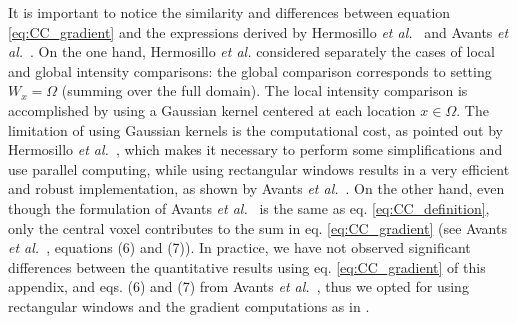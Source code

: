 It is important to notice the similarity and differences between equation \eqref{eq:CC_gradient} and the expressions derived by Hermosillo {\it et al.}~\cite{Hermosillo2004}
and Avants {\it et al.}~\cite{Avants2008}. On the one hand, Hermosillo {\it et al.} considered separately the cases of local and global intensity comparisons: the global comparison corresponds to setting $W_{x} = \Omega$ (summing over the full domain). The local intensity comparison is accomplished by using a Gaussian kernel centered at each location $x\in\Omega$. The limitation of using Gaussian kernels is the computational cost, as pointed out by Hermosillo {\it et al.}~\cite{Hermosillo2004},
which makes it necessary to perform some simplifications and use parallel computing, while using rectangular windows results in a very efficient and robust implementation, as shown by Avants {\it et al.}~\cite{Avants2008}. On the other hand, even though the formulation of Avants {\it et al.}~\cite{Avants2008}
is the same as eq. \eqref{eq:CC_definition}, only the central voxel contributes to the sum in eq. \eqref{eq:CC_gradient} (see Avants {\it et al.}~\cite{Avants2008}, equations (6) and (7)). In practice, we have not observed significant differences between the quantitative results using eq. \eqref{eq:CC_gradient} of this appendix, and eqs. (6) and (7) from Avants {\it et al.}~\cite{Avants2008}, thus we opted for using rectangular windows and the gradient computations as in \cite{Avants2008}.

